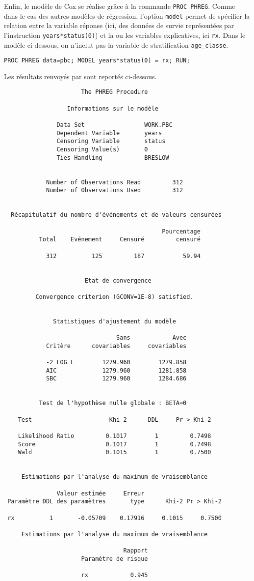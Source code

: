 Enfin, le modèle de Cox se réalise grâce à la commande \verb|PROC PHREG|. 
Comme dans le cas des autres modèles de régression, l'option
\verb|model| permet de spécifier la relation entre la variable réponse (ici,
des données de survie représentées par l'instruction \verb|years*status(0)|)
et la ou les variables explicatives, ici \texttt{rx}. Dans le modèle
ci-dessous, on n'inclut pas la variable de stratification \verb|age_classe|.
\begin{verbatim}
PROC PHREG data=pbc; MODEL years*status(0) = rx; RUN;
\end{verbatim}
Les résultats renvoyés par \SAS sont reportés ci-dessous.
\begin{verbatim}
                      The PHREG Procedure

                  Informations sur le modèle

               Data Set                 WORK.PBC
               Dependent Variable       years
               Censoring Variable       status
               Censoring Value(s)       0
               Ties Handling            BRESLOW


            Number of Observations Read         312
            Number of Observations Used         312


  Récapitulatif du nombre d'événements et de valeurs censurées

                                             Pourcentage
          Total    Evénement     Censuré         censuré

            312          125         187           59.94


                       Etat de convergence

         Convergence criterion (GCONV=1E-8) satisfied.


              Statistiques d'ajustement du modèle

                                Sans            Avec
            Critère      covariables     covariables

            -2 LOG L        1279.960        1279.858
            AIC             1279.960        1281.858
            SBC             1279.960        1284.686


          Test de l'hypothèse nulle globale : BETA=0

    Test                      Khi-2      DDL     Pr > Khi-2

    Likelihood Ratio         0.1017        1         0.7498
    Score                    0.1017        1         0.7498
    Wald                     0.1015        1         0.7500


     Estimations par l'analyse du maximum de vraisemblance

               Valeur estimée     Erreur
 Paramètre DDL des paramètres       type      Khi-2 Pr > Khi-2

 rx          1       -0.05709    0.17916     0.1015     0.7500

     Estimations par l'analyse du maximum de vraisemblance

                                  Rapport
                      Paramètre de risque

                      rx            0.945
\end{verbatim}
